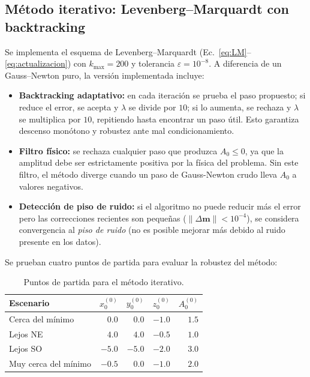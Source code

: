 \documentclass[12pt, a4paper]{article}
\begin{document}
\subsection{Método iterativo: Levenberg--Marquardt con backtracking}
\label{sec:metodo_iterativo}

Se implementa el esquema de Levenberg--Marquardt
(Ec.~\ref{eq:LM}--\ref{eq:actualizacion}) con $k_{\max} = 200$ y
tolerancia $\varepsilon = 10^{-8}$. A diferencia de un Gauss--Newton
puro, la versión implementada incluye:

\begin{itemize}[leftmargin=*, itemsep=2pt]
    \item \textbf{Backtracking adaptativo:} en cada iteración se prueba
    el paso propuesto; si reduce el error, se acepta y $\lambda$ se
    divide por $10$; si lo aumenta, se rechaza y $\lambda$ se multiplica
    por $10$, repitiendo hasta encontrar un paso útil. Esto garantiza
    descenso monótono y robustez ante mal condicionamiento.
    \item \textbf{Filtro físico:} se rechaza cualquier paso que
    produzca $A_0 \le 0$, ya que la amplitud debe ser estrictamente
    positiva por la física del problema. Sin este filtro, el método
    diverge cuando un paso de Gauss-Newton crudo lleva $A_0$ a valores
    negativos.
    \item \textbf{Detección de piso de ruido:} si el algoritmo no puede
    reducir más el error pero las correcciones recientes son pequeñas
    ($\|\Delta\mathbf{m}\| < 10^{-4}$), se considera convergencia al
    \emph{piso de ruido} (no es posible mejorar más debido al ruido
    presente en los datos).
\end{itemize}

Se prueban cuatro puntos de partida para evaluar la robustez del
método:

\begin{table}[H]
    \centering
    \caption{Puntos de partida para el método iterativo.}
    \label{tab:inicios}
    \begin{tabular}{lrrrr}
        \toprule
        \textbf{Escenario} &
        $x_0^{(0)}$ & $y_0^{(0)}$ & $z_0^{(0)}$ & $A_0^{(0)}$ \\
        \midrule
        Cerca del mínimo       & $ 0.0$ & $ 0.0$ & $-1.0$ & $1.5$ \\
        Lejos NE               & $ 4.0$ & $ 4.0$ & $-0.5$ & $1.0$ \\
        Lejos SO               & $-5.0$ & $-5.0$ & $-2.0$ & $3.0$ \\
        Muy cerca del mínimo   & $-0.5$ & $ 0.0$ & $-1.0$ & $2.0$ \\
        \bottomrule
    \end{tabular}
\end{table}
\end{document}

